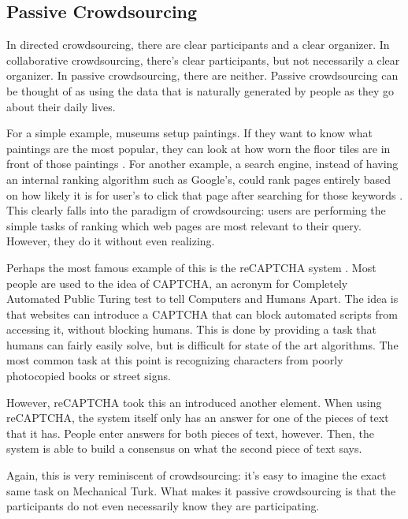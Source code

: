 \subsection{Passive Crowdsourcing}
In directed crowdsourcing, there are clear participants and a clear organizer. In collaborative crowdsourcing, there's clear participants, but not necessarily a clear organizer. In passive crowdsourcing, there are neither. Passive crowdsourcing can be thought of as using the data that is naturally generated by people as they go about their daily lives. 

For a simple example, museums setup paintings. If they want to know what paintings are the most popular, they can look at how worn the floor tiles are in front of those paintings \cite{crowdsourcing}. For another example, a search engine, instead of having an internal ranking algorithm such as Google's, could rank pages entirely based on how likely it is for user's to click that page after searching for those keywords \cite{crowdsourcing}. This clearly falls into the paradigm of crowdsourcing: users are performing the simple tasks of ranking which web pages are most relevant to their query. However, they do it without even realizing.

Perhaps the most famous example of this is the reCAPTCHA system \cite{recaptcha}. Most people are used to the idea of CAPTCHA, an acronym for Completely Automated Public Turing test to tell Computers and Humans Apart. The idea is that websites can introduce a CAPTCHA that can block automated scripts from accessing it, without blocking humans. This is done by providing a task that humans can fairly easily solve, but is difficult for state of the art algorithms. The most common task at this point is recognizing characters from poorly photocopied books or street signs.

However, reCAPTCHA took this an introduced another element. When using reCAPTCHA, the system itself only has an answer for one of the pieces of text that it has. People enter answers for both pieces of text, however. Then, the system is able to build a consensus on what the second piece of text says. 

Again, this is very reminiscent of crowdsourcing: it's easy to imagine the exact same task on Mechanical Turk. What makes it passive crowdsourcing is that the participants do not even necessarily know they are participating.